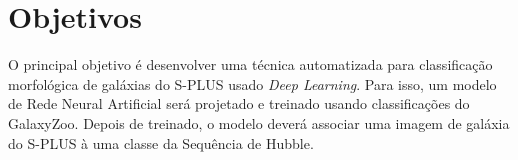 \section*{Objetivos}

O principal objetivo é desenvolver uma técnica automatizada para classificação morfológica de galáxias do S-PLUS usado \emph{Deep Learning}. Para isso, um modelo de Rede Neural Artificial será projetado e treinado usando classificações do GalaxyZoo. Depois de treinado, o modelo deverá associar uma imagem de galáxia do S-PLUS à uma classe da Sequência de Hubble.